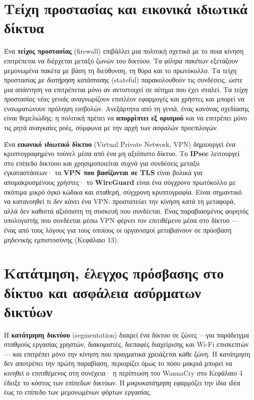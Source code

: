 \documentclass[11pt,openany]{book}
\begin{document}
\section{Τείχη προστασίας και εικονικά ιδιωτικά δίκτυα}\label{sec:6.5}
Ένα \textbf{τείχος προστασίας} (firewall) επιβάλλει μια πολιτική σχετικά με το ποια κίνηση επιτρέπεται να διέρχεται μεταξύ ζωνών του δικτύου. Τα \emph{φίλτρα πακέτων} εξετάζουν μεμονωμένα πακέτα με βάση τη διεύθυνση, τη θύρα και το πρωτόκολλο. Τα τείχη προστασίας \emph{με διατήρηση κατάστασης} (stateful) παρακολουθούν τις συνδέσεις, ώστε μια απάντηση να επιτρέπεται μόνο αν αντιστοιχεί σε αίτημα που έχει σταλεί. Τα \emph{τείχη προστασίας νέας γενιάς} αναγνωρίζουν επιπλέον εφαρμογές και χρήστες και μπορεί να ενσωματώνουν πρόληψη εισβολών. Ανεξάρτητα από τη γενιά, ένας κανόνας σχεδίασης είναι θεμελιώδης: η πολιτική πρέπει να \textbf{απορρίπτει εξ ορισμού} και να επιτρέπει μόνο τις ρητά αναγκαίες ροές, σύμφωνα με την αρχή των ασφαλών προεπιλογών.

Ένα \textbf{εικονικό ιδιωτικό δίκτυο} (Virtual Private Network, VPN) δημιουργεί ένα κρυπτογραφημένο τούνελ μέσα από ένα μη αξιόπιστο δίκτυο. Το \textbf{IPsec} λειτουργεί στο επίπεδο δικτύου και χρησιμοποιείται συχνά για συνδέσεις μεταξύ εγκαταστάσεων· τα \textbf{VPN που βασίζονται σε TLS} είναι βολικά για απομακρυσμένους χρήστες· το \textbf{WireGuard} είναι ένα σύγχρονο πρωτόκολλο με σκόπιμα μικρό όγκο κώδικα και σταθερή, σύγχρονη κρυπτογραφία. Είναι σημαντικό να κατανοηθεί τι \emph{δεν} κάνει ένα VPN: προστατεύει την κίνηση κατά τη μεταφορά, αλλά δεν καθιστά αξιόπιστη τη συσκευή που συνδέεται. Ένας παραβιασμένος φορητός υπολογιστής που συνδέεται μέσω VPN φέρνει τον επιτιθέμενο μέσα στο δίκτυο —ένας από τους λόγους για τους οποίους οι οργανισμοί μεταβαίνουν σε πρόσβαση μηδενικής εμπιστοσύνης (Κεφάλαιο 13).

\section{Κατάτμηση, έλεγχος πρόσβασης στο δίκτυο και ασφάλεια ασύρματων δικτύων}\label{sec:6.6}
Η \textbf{κατάτμηση δικτύου} (segmentation) διαιρεί ένα δίκτυο σε ζώνες —για παράδειγμα σταθμούς εργασίας χρηστών, διακομιστές, διεπαφές διαχείρισης και Wi-Fi επισκεπτών— και επιτρέπει μόνο την κίνηση που πραγματικά χρειάζεται κάθε ζώνη. Η κατάτμηση δεν αποτρέπει την πρώτη παραβίαση, περιορίζει όμως το πόσο μακριά μπορεί να κινηθεί ο επιτιθέμενος στη συνέχεια· η περίπτωση του WannaCry στο Κεφάλαιο 4 έδειξε το κόστος των επίπεδων δικτύων. Η \emph{μικροκατάτμηση} εφαρμόζει την ίδια ιδέα έως το επίπεδο των μεμονωμένων φόρτων εργασίας.
\end{document}
